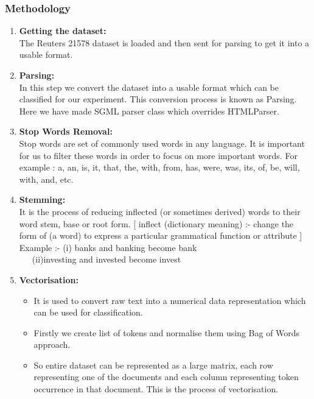 \documentclass{beamer}
\newcommand\tab[1][1cm]{\hspace*{#1}}
\begin{document}
\begin{frame}[t, allowframebreaks]

\frametitle{\tab \tab \tab \tab \quad \huge Methodology}
\footnotesize
\begin{enumerate}
\item \textbf{Getting the dataset:}\\
The Reuters 21578 dataset is loaded and then sent for parsing to get it into a usable format.

\item \textbf{Parsing:}\\
In this step we convert the dataset into a usable format which can be classified for our experiment. This
conversion process is known as Parsing. Here we have made SGML parser class which overrides
HTMLParser.

\item \textbf{Stop Words Removal:} \\
Stop words are set of commonly used words in any language. It is important for us to filter these words in
order to focus on more important words. For example : a, an, is, it, that, the, with, from, has, were, was, its,
of, be, will, with, and, etc.

\item \textbf{Stemming:} \\
It is the process of reducing inflected (or sometimes derived) words to their word stem, base or root form.
[ inflect (dictionary meaning) :- change the form of (a word) to express a particular grammatical function or
attribute ] \\
Example :- (i) banks and banking become bank \\
\tab \quad \ \ \ (ii)investing and invested become invest 
\linebreak

\item \textbf{Vectorisation:}\\
\begin{itemize}
\item It is used to convert raw text into a numerical data representation which can be used for classification.
\item Firstly we create list of tokens and normalise them using Bag of Words approach.
\item So entire dataset can be represented as a large matrix, each row representing one of the documents and each column representing token occurrence in that document. This is the process of vectorisation.
\end{itemize}


\end{enumerate}
\end{frame}
\end{document}
